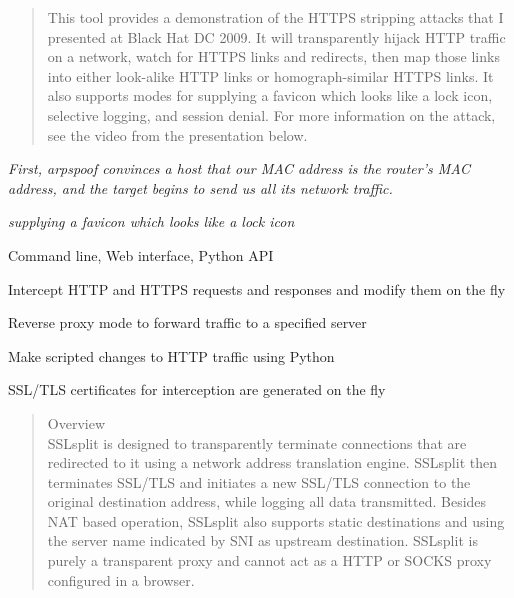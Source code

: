 \documentclass[Screen16to9,17pt]{foils}
\begin{document}

\begin{quote}
This tool provides a demonstration of the HTTPS stripping attacks that I presented at Black Hat DC 2009. It will transparently hijack HTTP traffic on a network, watch for HTTPS links and redirects, then map those links into either look-alike HTTP links or homograph-similar HTTPS links. It also supports modes for supplying a favicon which looks like a lock icon, selective logging, and session denial. For more information on the attack, see the video from the presentation below.
\end{quote}


\begin{list2}
\item \emph{First, arpspoof convinces a host that our MAC address is the router’s MAC address, and the target begins to send us all its network traffic.}
\item \emph{supplying a favicon which looks like a lock icon}
\end{list2}




\begin{list2}
\item Command line, Web interface, Python API
\item Intercept HTTP and HTTPS requests and responses and modify them on the fly
\item Reverse proxy mode to forward traffic to a specified server
\item Make scripted changes to HTTP traffic using Python
\item SSL/TLS certificates for interception are generated on the fly
\end{list2}


\begin{quote}\small
Overview\\
SSLsplit is designed to transparently terminate connections that are redirected to it using a network address translation engine. SSLsplit then terminates SSL/TLS and initiates a new SSL/TLS connection to the original destination address, while logging all data transmitted. Besides NAT based operation, SSLsplit also supports static destinations and using the server name indicated by SNI as upstream destination. SSLsplit is purely a transparent proxy and cannot act as a HTTP or SOCKS proxy configured in a browser.
\end{quote}
\end{document}
